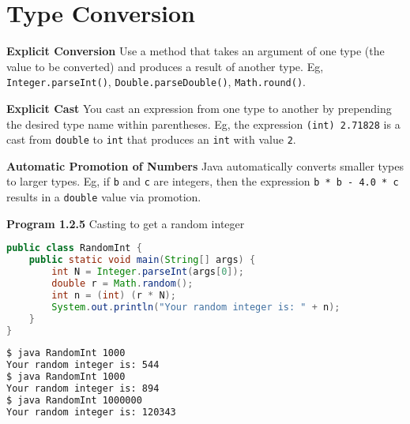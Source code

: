\documentclass[8pt,a4paper,compress]{beamer}
\begin{document}
\section{Type Conversion}
\begin{frame}[fragile]
\pause

\textbf{Explicit Conversion} Use a method that takes an argument of one type (the value to be converted) and produces a result of another type. Eg, \lstinline$Integer.parseInt()$, \lstinline$Double.parseDouble()$, \lstinline$Math.round()$.

\pause
\smallskip

\textbf{Explicit Cast} You cast an expression from one type to another by prepending the desired type name within parentheses. Eg, the expression \lstinline$(int) 2.71828$ is a cast from \lstinline$double$ to \lstinline$int$ that produces an \lstinline$int$ with value \lstinline$2$. 

\pause
\smallskip

\textbf{Automatic Promotion of Numbers} Java automatically converts smaller types to larger types. Eg, if \lstinline$b$ and \lstinline$c$ are integers, then the expression \lstinline$b * b - 4.0 * c$ results in a \lstinline$double$ value via promotion.   

\pause
\smallskip

\textbf{Program 1.2.5} Casting to get a random integer

\begin{lstlisting}[language=Java]
public class RandomInt { 
    public static void main(String[] args) { 
        int N = Integer.parseInt(args[0]);
        double r = Math.random(); 
        int n = (int) (r * N);
        System.out.println("Your random integer is: " + n);
    }
}
\end{lstlisting}

\pause

\begin{lstlisting}[language=bash]
$ java RandomInt 1000
Your random integer is: 544
$ java RandomInt 1000
Your random integer is: 894
$ java RandomInt 1000000
Your random integer is: 120343
\end{lstlisting}
\end{frame}
\end{document}
